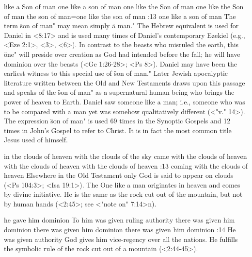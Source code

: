     {like a Son of man} %
    {one like a son of man} %
    {one like the Son of man} %
    {one like the Son of man} %
    {the son of man}={one like the son of man} %
:13 {one like a son of man} The
term \"son of man" may mean simply \"a man." The Hebrew equivalent is used for Daniel in <8:17> and is
used many times of Daniel's contemporary Ezekiel (e.g., <Eze 2:1>, <3>, <6>).
In contrast to the beasts who
misruled the earth, this \"one" will preside over creation as God had intended before the fall; he
will have dominion over the beasts (<Ge 1:26-28>; <Ps 8>). Daniel may have been the earliest witness to
this special use of \"son of man." Later Jewish apocalyptic literature written between the Old and
New Testaments draws upon this passage and speaks of the \"son of man" as a supernatural human being
who brings the power of heaven to Earth. Daniel saw someone like a man; i.e., someone who was to
be compared with a man yet was somehow qualitatively different (<"v." 14>). The expression \"son of man"
is used 69 times in the Synoptic Gospels and 12 times in John's Gospel to refer to Christ. It is in
fact the most common title Jesus used of himself.

    {in the clouds of heaven} %
    { with the clouds of the sky} %
    {came with the clouds of heaven} %
    {with the clouds of heaven} %
    {with the clouds of heaven} %
:13 {coming with the clouds of heaven} Elsewhere in
the Old Testament only God is said to appear on clouds (<Ps 104:3>; <Isa 19:1>). The One like a man
originates in heaven and comes by divine initiative. He is the same as the rock cut out of the
mountain, but not by human hands (<2:45>; see <"note on" 7:14>n).

    {he gave him dominion} %
    {To him was given ruling authority} %
    {there was given him dominion} %
    {there was given him dominion} %
    {there was given him dominion} %
:14 {He was given authority} God gives
him vice-regency over all the nations. He fulfills the symbolic rule of the rock cut out of a
mountain (<2:44-45>).


